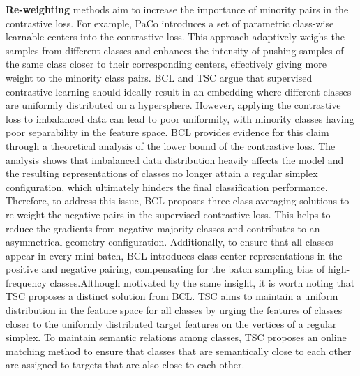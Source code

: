 \textbf{Re-weighting} methods aim to increase the importance of minority pairs in the contrastive loss. For example, PaCo \cite{cui2021parametric} introduces a set of parametric class-wise learnable centers into the contrastive loss. This approach adaptively weighs the samples from different classes and enhances the intensity of pushing samples of the same class closer to their corresponding centers, effectively giving more weight to the minority class pairs.
BCL and TSC \cite{zhu2022balanced, li2022targeted} argue that supervised contrastive learning should ideally result in an embedding where different classes are uniformly distributed on a hypersphere. However, applying the contrastive loss to imbalanced data can lead to poor uniformity, with minority classes having poor separability in the feature space. 
BCL provides evidence for this claim through a theoretical analysis of the lower bound of the contrastive loss. The analysis shows that imbalanced data distribution heavily affects the model and the resulting representations of classes no longer attain a regular simplex configuration, which ultimately hinders the final classification performance.
Therefore, to address this issue, BCL proposes three class-averaging solutions to re-weight the negative pairs in the supervised contrastive loss. This helps to reduce the gradients from negative majority classes and contributes to an asymmetrical geometry configuration. Additionally, to ensure that all classes appear in every mini-batch, BCL introduces class-center representations in the positive and negative pairing, compensating for the batch sampling bias of high-frequency classes.Although motivated by the same insight, it is worth noting that TSC proposes a distinct solution from BCL. TSC aims to maintain a uniform distribution in the feature space for all classes by urging the features of classes closer to the uniformly distributed target features on the vertices of a regular simplex. To maintain semantic relations among classes, TSC proposes an online matching method to ensure that classes that are semantically close to each other are assigned to targets that are also close to each other.

